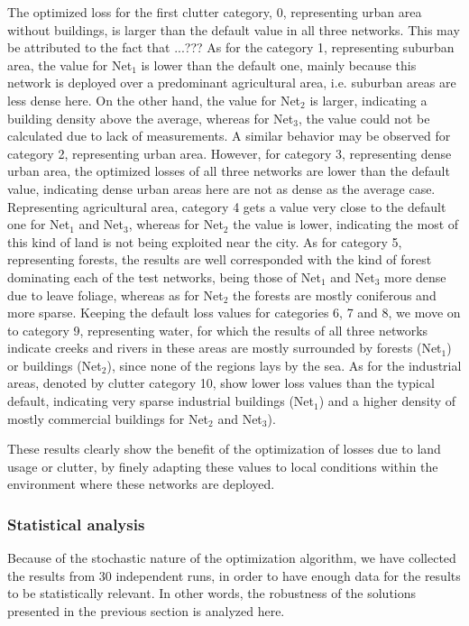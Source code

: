 The optimized loss for the first clutter category, 0, representing
urban area without buildings, is larger than the default value in
all three networks. This may be attributed to the fact that ...???
As for the category 1, representing suburban area, the value for Net$_{1}$
is lower than the default one, mainly because this network is deployed
over a predominant agricultural area, i.e. suburban areas are less
dense here. On the other hand, the value for Net$_{2}$ is larger,
indicating a building density above the average, whereas for Net$_{3}$,
the value could not be calculated due to lack of measurements. A similar
behavior may be observed for category 2, representing urban area.
However, for category 3, representing dense urban area, the optimized
losses of all three networks are lower than the default value, indicating
dense urban areas here are not as dense as the average case. Representing
agricultural area, category 4 gets a value very close to the default
one for Net$_{1}$ and Net$_{3}$, whereas for Net$_{2}$ the value
is lower, indicating the most of this kind of land is not being exploited
near the city. As for category 5, representing forests, the results
are well corresponded with the kind of forest dominating each of the
test networks, being those of Net$_{1}$ and Net$_{3}$ more dense
due to leave foliage, whereas as for Net$_{2}$ the forests are mostly
coniferous and more sparse. Keeping the default loss values for categories
6, 7 and 8, we move on to category 9, representing water, for which
the results of all three networks indicate creeks and rivers in these
areas are mostly surrounded by forests (Net$_{1}$) or buildings (Net$_{2}$),
since none of the regions lays by the sea. As for the industrial areas,
denoted by clutter category 10, show lower loss values than the typical
default, indicating very sparse industrial buildings (Net$_{1}$)
and a higher density of mostly commercial buildings for Net$_{2}$
and Net$_{3}$).

These results clearly show the benefit of the optimization of losses
due to land usage or clutter, by finely adapting these values to local
conditions within the environment where these networks are deployed.


\subsubsection{Statistical analysis}

Because of the stochastic nature of the optimization algorithm, we
have collected the results from 30 independent runs, in order to have
enough data for the results to be statistically relevant. In other
words, the robustness of the solutions presented in the previous section
is analyzed here.


